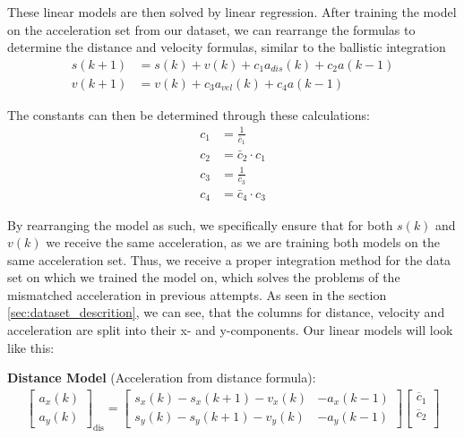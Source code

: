 These linear models are then solved by linear regression. 
After training the model on the acceleration set from our dataset, we can rearrange the formulas
to determine the distance and velocity formulas, similar to the ballistic integration
\begin{align} 
    s(k+1) &= s(k) + v(k) + c_1 a_{dis}(k) + c_2 a(k-1) \\
    v(k+1) &= v(k)        + c_3 a_{vel}(k) + c_4 a(k-1)
\end{align}


The constants can then be determined through these calculations:
\begin{align}
   c_1 &= \frac{1}{\bar{c}_1} \\
   c_2 &= \bar{c}_2 \cdot c_1 \\
   c_3 &= \frac{1}{\bar{c}_3} \\
   c_4 &= \bar{c}_4 \cdot c_3
\end{align}

By rearranging the model as such, we specifically ensure that for both $s(k)$ and $v(k)$ we receive the same 
acceleration, as we are training both models on the same acceleration set.
Thus, we receive a proper integration method for the data set on which we trained the model on, which solves the 
problems of the mismatched acceleration in previous attempts.
As seen in the section \ref{sec:dataset_descrition}, we can see, that the columns for distance, velocity and acceleration are 
split into their x- and y-components.
Our linear models will look like this:

\hfil

\textbf{Distance Model} (Acceleration from distance formula):
{\footnotesize
\begin{align} \label{eq:lin_model_acc_dis}
    \begin{bmatrix}
        a_x(k) \\ 
        a_y(k)       
    \end{bmatrix}_{\text{dis}}
    =
    \begin{bmatrix}
       s_x(k) - s_x(k+1) - v_x(k) & -a_x(k-1) \\ 
       s_y(k) - s_y(k+1) - v_y(k) & -a_y(k-1)   
    \end{bmatrix}
    \begin{bmatrix}
        \overline{c}_1 \\
        \overline{c}_2 \\
   \end{bmatrix}
\end{align}
}

